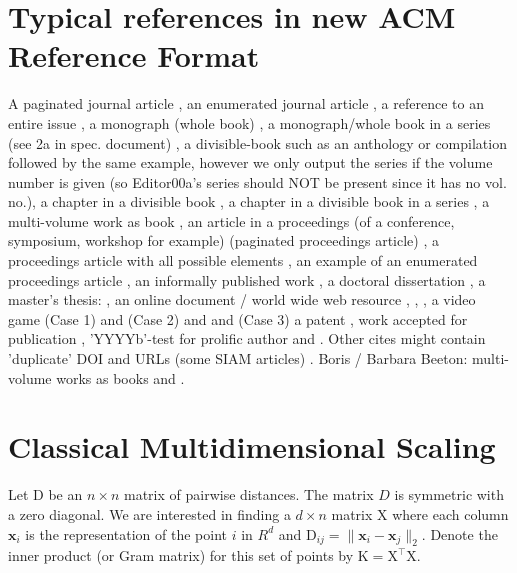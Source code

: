 \documentclass{dnacm} %
\begin{document}

\section{Typical references in new ACM Reference Format}
A paginated journal article \cite{Abril07}, an enumerated
journal article \cite{Cohen07}, a reference to an entire issue \cite{JCohen96},
a monograph (whole book) \cite{Kosiur01}, a monograph/whole book in a series (see 2a in spec. document)
\cite{Harel79}, a divisible-book such as an anthology or compilation \cite{Editor00}
followed by the same example, however we only output the series if the volume number is given
\cite{Editor00a} (so Editor00a's series should NOT be present since it has no vol. no.),
a chapter in a divisible book \cite{Spector90}, a chapter in a divisible book
in a series \cite{Douglass98}, a multi-volume work as book \cite{Knuth97},
an article in a proceedings (of a conference, symposium, workshop for example)
(paginated proceedings article) \cite{Andler79}, a proceedings article
with all possible elements \cite{Smith10}, an example of an enumerated
proceedings article \cite{VanGundy07},
an informally published work \cite{Harel78}, a doctoral dissertation \cite{Clarkson85},
a master's thesis: \cite{anisi03}, an online document / world wide web resource \cite{Thornburg01}, \cite{Ablamowicz07},
\cite{Poker06}, a video game (Case 1) \cite{Obama08} and (Case 2) \cite{Novak03}
and \cite{Lee05} and (Case 3) a patent \cite{JoeScientist001},
work accepted for publication \cite{rous08}, 'YYYYb'-test for prolific author
\cite{SaeediMEJ10} and \cite{SaeediJETC10}. Other cites might contain
'duplicate' DOI and URLs (some SIAM articles) \cite{Kirschmer:2010:AEI:1958016.1958018}.
Boris / Barbara Beeton: multi-volume works as books
\cite{MR781536} and \cite{MR781537}.

\appendix

\section{Classical Multidimensional Scaling}
\label{sec:cmds}

Let $\mathrm{D}$ be an $n\times n$ matrix of pairwise distances. The
matrix $D$ is symmetric with a zero diagonal. We are interested in
finding a $d \times n$ matrix $\mathrm{X}$ where each column
$\bm{x}_{i}$ is the representation of the point $i$ in $R^{d}$ and
$\mathrm{D}_{ij} = \|\bm{x}_{i}-\bm{x}_{j}\|_{2}$. Denote the inner
product (or Gram matrix) for this set of points by $\mathrm{K} =
\mathrm{X}^{\top}\mathrm{X}$.
\end{document}
